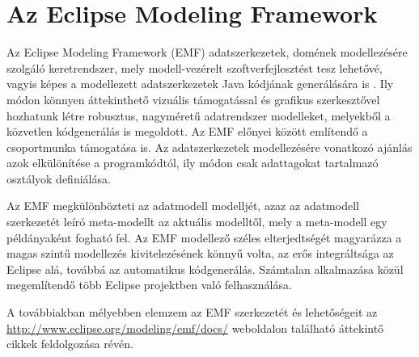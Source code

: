 \section{Az Eclipse Modeling Framework}

Az Eclipse Modeling Framework (\gls{EMF}) adatszerkezetek, domének modellezésére szolgáló keretrendszer, mely modell-vezérelt szoftverfejlesztést tesz lehetővé, vagyis képes a modellezett adatszerkezetek Java kódjának generálására is \cite{VogelEMF}.
Ily módon könnyen áttekinthető vizuális támogatással és grafikus szerkesztővel hozhatunk létre robusztus, nagyméretű adatrendszer modelleket, melyekből a közvetlen kódgenerálás is megoldott.
Az \gls{EMF} előnyei között említendő a csoportmunka támogatása is.
Az adatszerkezetek modellezésére vonatkozó ajánlás azok elkülönítése a programkódtól, ily módon csak adattagokat tartalmazó osztályok definiálása.

Az \gls{EMF} megkülönbözteti az adatmodell modelljét, azaz az adatmodell szerkezetét leíró meta-modellt az aktuális modelltől, mely a meta-modell egy példányaként fogható fel. 
Az \gls{EMF} modellező széles elterjedtségét magyarázza a magas szintű modellezés kivitelezésének könnyű volta, az erős integráltsága az Eclipse alá, továbbá az automatikus kódgenerálás.
Számtalan alkalmazása közül megemlítendő több Eclipse projektben való felhasználása.

A továbbiakban mélyebben elemzem az \gls{EMF} szerkezetét és lehetőségeit az \url{http://www.eclipse.org/modeling/emf/docs/} weboldalon található áttekintő cikkek \cite{Steinberg:2009:EEM:1197540,VogelEMF} feldolgozása révén.

